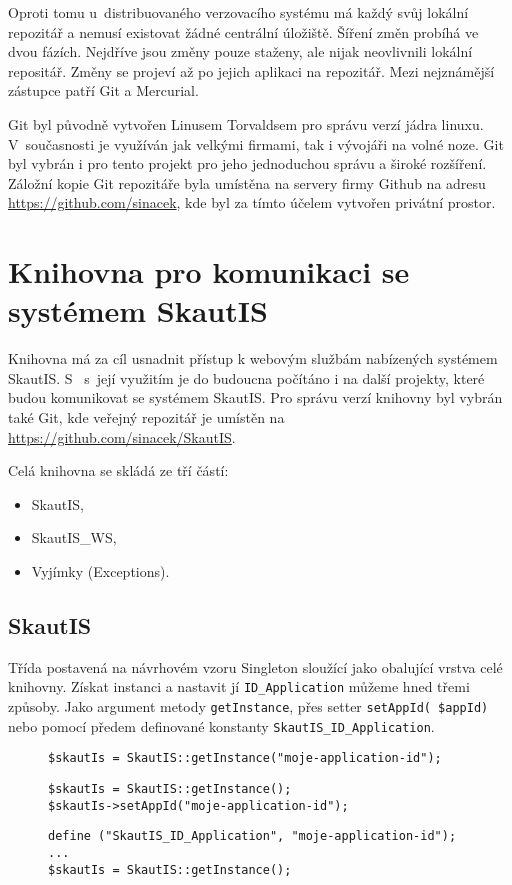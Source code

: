 \documentclass[thesis=B,czech]{FITthesis}[2012/04/27]
\begin{document}
Oproti tomu u~distribuovaného verzovacího systému má každý svůj lokální repozitář a nemusí existovat žádné centrální úložiště. Šíření změn probíhá ve dvou fázích. Nejdříve jsou změny pouze staženy, ale nijak neovlivnili lokální repositář. Změny se projeví až po jejich aplikaci na repozitář. Mezi nejznámější zástupce patří Git a Mercurial.

Git byl původně vytvořen Linusem Torvaldsem pro správu verzí jádra linuxu. V~současnosti je využíván jak velkými firmami, tak i vývojáři na volné noze. Git byl vybrán i pro tento projekt pro jeho jednoduchou správu a široké rozšíření. Záložní kopie Git repozitáře byla umístěna na servery firmy Github na adresu \url{https://github.com/sinacek}, kde byl za tímto účelem vytvořen privátní prostor.

\section{Knihovna pro komunikaci se systémem SkautIS}
Knihovna má za cíl usnadnit přístup k webovým službám nabízených systémem SkautIS. S~ s~její využitím je do budoucna počítáno i na další projekty, které budou komunikovat se systémem SkautIS. Pro správu verzí knihovny byl vybrán také Git, kde veřejný repozitář je umístěn na \url{https://github.com/sinacek/SkautIS}.

Celá knihovna se skládá ze tří částí:
\begin{itemize}
	\item SkautIS,
	\item SkautIS\_WS,
	\item Vyjímky (Exceptions).
\end{itemize}

\subsection{SkautIS}
Třída postavená na návrhovém vzoru Singleton sloužící jako obalující vrstva celé knihovny. Získat instanci a nastavit jí \texttt{ID\_Application} můžeme hned třemi způsoby. Jako argument metody \texttt{getInstance}, přes setter \texttt{setAppId( \$appId)} nebo pomocí předem definované konstanty \texttt{SkautIS\_ID\_Application}.

\begin{figure}
\begin{lstlisting}[caption=Nastavení parametrů knihovny SkautIS -- přes argument]
$skautIs = SkautIS::getInstance("moje-application-id");
\end{lstlisting}

\begin{lstlisting}[caption=Nastavení parametrů knihovny SkautIS -- přes setter]
$skautIs = SkautIS::getInstance();
$skautIs->setAppId("moje-application-id"); 
\end{lstlisting}

\begin{lstlisting}[caption=Nastavení parametrů knihovny SkautIS -- přes konstantu]
define ("SkautIS_ID_Application", "moje-application-id"); 
...
$skautIs = SkautIS::getInstance(); 
\end{lstlisting}
\end{figure}
\end{document}
